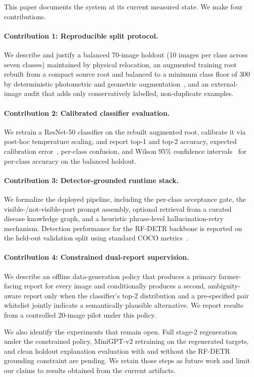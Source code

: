 This paper documents the system at its current measured state. We make four
contributions.

\paragraph{Contribution 1: Reproducible split protocol.}
We describe and justify a balanced 70-image holdout (10 images per class
across seven classes) maintained by physical relocation, an augmented
training root rebuilt from a compact source root and balanced to a minimum
class floor of 300 by deterministic photometric and geometric
augmentation~\citep{shorten2019augmentation}, and an external-image audit
that adds only conservatively labelled, non-duplicate examples.

\paragraph{Contribution 2: Calibrated classifier evaluation.}
We retrain a ResNet-50 classifier on the rebuilt augmented root, calibrate
it via post-hoc temperature scaling, and report top-1 and top-2 accuracy,
expected calibration error~\citep{naeini2015ece}, per-class confusion, and
Wilson 95\% confidence intervals~\citep{wilson1927interval} for per-class
accuracy on the balanced holdout.

\paragraph{Contribution 3: Detector-grounded runtime stack.}
We formalize the deployed pipeline, including the per-class acceptance
gate, the visible-/not-visible-part prompt assembly, optional retrieval
from a curated disease knowledge graph, and a heuristic phrase-level
hallucination-retry mechanism. Detection performance for the RF-DETR
backbone is reported on the held-out validation split using standard COCO
metrics~\citep{lin2014cocoeval}.

\paragraph{Contribution 4: Constrained dual-report supervision.}
We describe an offline data-generation policy that produces a primary
farmer-facing report for every image and conditionally produces a second,
ambiguity-aware report only when the classifier's top-2 distribution and a
pre-specified pair whitelist jointly indicate a semantically plausible
alternative. We report results from a controlled 20-image pilot under this
policy.

We also identify the experiments that remain open. Full stage-2 regeneration
under the constrained policy, MiniGPT-v2 retraining on the regenerated
targets, and clean holdout explanation evaluation with and without the
RF-DETR grounding constraint are pending. We retain those steps as future
work and limit our claims to results obtained from the current artifacts.

